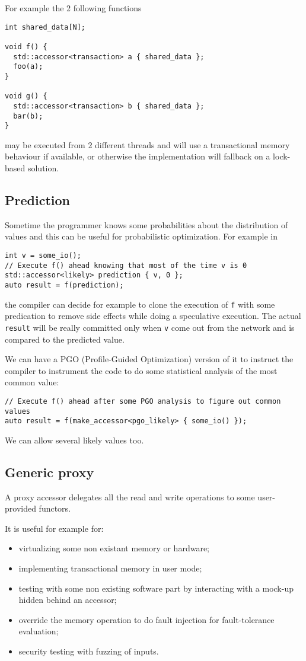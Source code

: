 \documentclass[a4paper]{article}
\begin{document}
For example the 2 following functions
\begin{lstlisting}
int shared_data[N];

void f() {
  std::accessor<transaction> a { shared_data };
  foo(a);
}

void g() {
  std::accessor<transaction> b { shared_data };
  bar(b);
}
\end{lstlisting}
may be executed from 2 different threads and will use a transactional
memory behaviour if available, or otherwise the implementation will
fallback on a lock-based solution.


\subsection{Prediction}
\label{sec:prediction}

Sometime the programmer knows some probabilities about the
distribution of values and this can be useful for probabilistic
optimization. For example in
\begin{lstlisting}
int v = some_io();
// Execute f() ahead knowing that most of the time v is 0
std::accessor<likely> prediction { v, 0 };
auto result = f(prediction);
\end{lstlisting}
the compiler can decide for example to clone the execution of
\texttt{f} with some predication to remove side effects while doing a
speculative execution. The actual \texttt{result} will be really
committed only when \texttt{v} come out from the network and is
compared to the predicted value.


We can have a PGO (Profile-Guided Optimization) version of it to
instruct the compiler to instrument the code to do some statistical
analysis of the most common value:
\begin{lstlisting}
// Execute f() ahead after some PGO analysis to figure out common values
auto result = f(make_accessor<pgo_likely> { some_io() });
\end{lstlisting}

We can allow several likely values too.


\subsection{Generic proxy}
\label{sec:generic-proxy}

A proxy accessor delegates all the read and write operations to some
user-provided functors.

It is useful for example for:
\begin{itemize}
\item virtualizing some non existant memory or hardware;
\item implementing transactional memory in user mode;
\item testing with some non existing software part by interacting with
  a mock-up hidden behind an accessor;
\item override the memory operation to do fault injection for
  fault-tolerance evaluation;
\item security testing with fuzzing of inputs.
\end{itemize}
\end{document}
